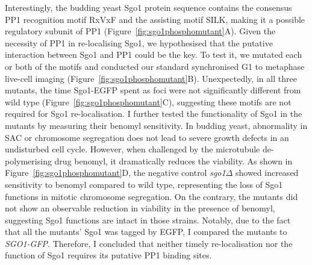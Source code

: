 Interestingly, the budding yeast Sgo1 protein sequence contains the consensus PP1 recognition motif RxVxF and the assisting motif SILK, making it a possible regulatory subunit of PP1 (Figure~\ref{fig:sgo1phosphomutant}A). Given the necessity of PP1 in re-localising Sgo1, we hypothesised that the putative interaction between Sgo1 and PP1 could be the key. To test it, we mutated each or both of the motifs and conducted our standard synchronised G1 to metaphase live-cell imaging (Figure~\ref{fig:sgo1phosphomutant}B). Unexpectedly, in all three mutants, the time Sgo1-EGFP spent as foci were not significantly different from wild type (Figure~\ref{fig:sgo1phosphomutant}C), suggesting these motifs are not required for Sgo1 re-localisation. I further tested the functionality of Sgo1 in the mutants by measuring their benomyl sensitivity. In budding yeast, abnormality in SAC or chromosome segregation does not lead to severe growth defects in an undisturbed cell cycle. However, when challenged by the microtubule de-polymerising drug benomyl, it dramatically reduces the viability. As shown in Figure~\ref{fig:sgo1phosphomutant}D, the negative control \textit{sgo1$\Delta$} showed increased sensitivity to benomyl compared to wild type, representing the loss of Sgo1 functions in mitotic chromosome segregation. On the contrary, the mutants did not show an observable reduction in viability in the presence of benomyl, suggesting Sgo1 functions are intact in those strains. Notably, due to the fact that all the mutants' Sgo1 was tagged by EGFP, I compared the mutants to \textit{SGO1-GFP}. Therefore, I concluded that neither timely re-localisation nor the function of Sgo1 requires its putative PP1 binding sites. 

